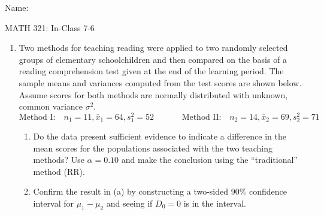 \documentclass{article}
\begin{document}
\hspace{375pt}Name:

\begin{center}
{\Huge MATH 321: In-Class 7-6}
\end{center}

\bigskip\bigskip




\begin{enumerate}
    \item Two methods for teaching reading were applied to two randomly selected groups of elementary schoolchildren and then compared on the basis of a reading comprehension test given at the end of the learning period. The sample means and variances computed from the test scores are shown below. Assume scores for both methods are normally distributed with unknown, common variance $\sigma^2$.
    \[\text{Method I}: \hspace{10pt} n_1 = 11, \bar{x}_1 = 64, s^2_1 = 52 \hspace{40pt} \text{Method II}: \hspace{10pt} n_2 = 14, \bar{x}_2 = 69, s^2_2 = 71\]
    \begin{enumerate}%
        \item Do the data present sufficient evidence to indicate a difference in the mean scores for the populations associated with the two teaching methods? Use $\alpha = 0.10$ and make the conclusion using the ``traditional'' method (RR).\vspace{150pt}
        \item Confirm the result in (a) by constructing a two-sided 90\% confidence interval for $\mu_1 - \mu_2$ and seeing if $D_0 = 0$ is in the interval.\vspace{60pt}%
    \end{enumerate}
    

\end{enumerate}
\end{document}
